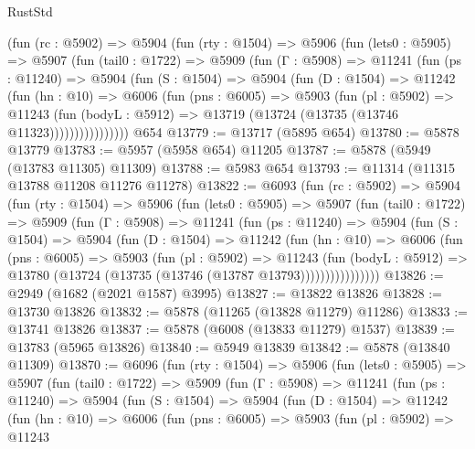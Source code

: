 \begin{lexlean}{RustStd}
\begin{coremodule}
      (fun (rc : @5902) =>
      @5904
        (fun (rty : @1504) =>
        @5906
          (fun (lets0 : @5905) =>
          @5907
            (fun (tail0 : @1722) =>
            @5909
              (fun (Γ : @5908) =>
              @11241
                (fun (ps : @11240) =>
                @5904
                  (fun (S : @1504) =>
                  @5904
                    (fun (D : @1504) =>
                    @11242
                      (fun (hn : @10) =>
                      @6006
                        (fun (pns : @6005) =>
                        @5903
                          (fun (pl : @5902) =>
                          @11243
                            (fun (bodyL : @5912) =>
                            @13719 (@13724 (@13735 (@13746 @11323))))))))))))))))
    @654
@13779 := @13717 (@5895 @654)
@13780 := @5878 @13779
@13783 := @5957 (@5958 @654) @11205
@13787 := @5878 (@5949 (@13783 @11305) @11309)
@13788 := @5983 @654
@13793 := @11314 (@11315 @13788 @11208 @11276 @11278)
@13822 := @6093
    (fun (rc : @5902) =>
    @5904
      (fun (rty : @1504) =>
      @5906
        (fun (lets0 : @5905) =>
        @5907
          (fun (tail0 : @1722) =>
          @5909
            (fun (Γ : @5908) =>
            @11241
              (fun (ps : @11240) =>
              @5904
                (fun (S : @1504) =>
                @5904
                  (fun (D : @1504) =>
                  @11242
                    (fun (hn : @10) =>
                    @6006
                      (fun (pns : @6005) =>
                      @5903
                        (fun (pl : @5902) =>
                        @11243
                          (fun (bodyL : @5912) =>
                          @13780 (@13724 (@13735 (@13746 (@13787 @13793))))))))))))))))
@13826 := @2949 (@1682 (@2021 @1587) @3995)
@13827 := @13822 @13826
@13828 := @13730 @13826
@13832 := @5878 (@11265 (@13828 @11279) @11286)
@13833 := @13741 @13826
@13837 := @5878 (@6008 (@13833 @11279) @1537)
@13839 := @13783 (@5965 @13826)
@13840 := @5949 @13839
@13842 := @5878 (@13840 @11309)
@13870 := @6096
    (fun (rty : @1504) =>
    @5906
      (fun (lets0 : @5905) =>
      @5907
        (fun (tail0 : @1722) =>
        @5909
          (fun (Γ : @5908) =>
          @11241
            (fun (ps : @11240) =>
            @5904
              (fun (S : @1504) =>
              @5904
                (fun (D : @1504) =>
                @11242
                  (fun (hn : @10) =>
                  @6006
                    (fun (pns : @6005) =>
                    @5903
                      (fun (pl : @5902) =>
                      @11243

\end{coremodule}
\end{lexlean}
